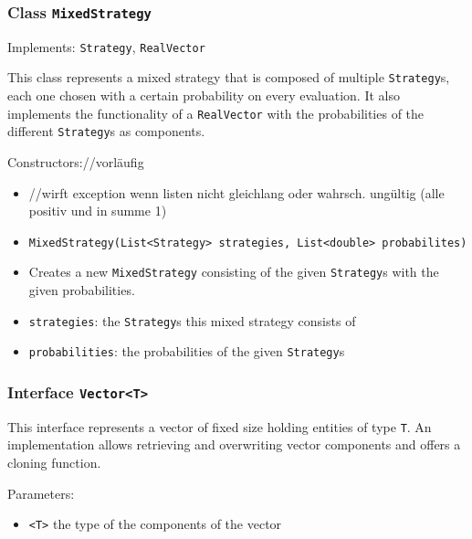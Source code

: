 \documentclass[parskip=full,11pt]{scrartcl}
\begin{document}
\subsubsection{Class \texttt{MixedStrategy}}
Implements: \texttt{Strategy}, \texttt{RealVector}

This class represents a mixed strategy that is composed of multiple \texttt{Strategy}s, each one chosen with a certain probability on every evaluation. It also implements the functionality of a \texttt{RealVector} with the probabilities of the different \texttt{Strategy}s as components.

Constructors://vorläufig
\begin{itemize}\itemsep -10pt
\item[] //wirft exception wenn listen nicht gleichlang oder wahrsch. ungültig (alle positiv und in summe 1)
\item \texttt{MixedStrategy(List<Strategy> strategies, List<double> probabilites)}
\item[] Creates a new \texttt{MixedStrategy} consisting of the given \texttt{Strategy}s with the given probabilities.
\item[] \texttt{strategies}: the \texttt{Strategy}s this mixed strategy consists of
\item[] \texttt{probabilities}: the probabilities of the given \texttt{Strategy}s
\end{itemize}

\subsubsection{Interface \texttt{Vector<T>}}
This interface represents a vector of fixed size holding entities of type \texttt{T}. An implementation allows retrieving and overwriting vector components and offers a cloning function.

Parameters:
\begin{itemize}\itemsep -10pt
\item \texttt{<T>} the type of the components of the vector
\end{itemize}
\end{document}
